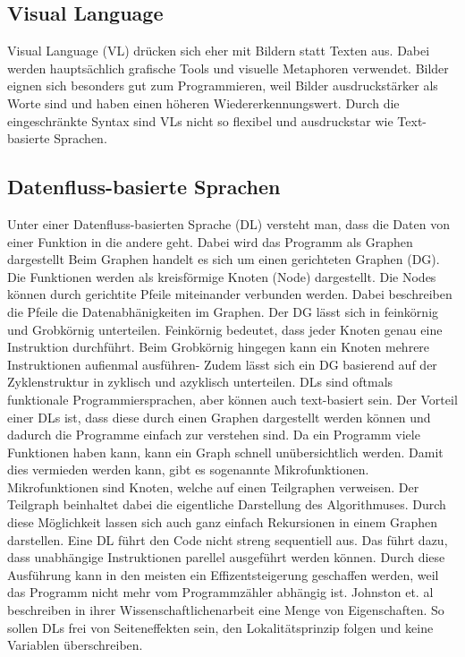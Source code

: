 \documentclass{article}
\begin{document}
    \subsection{Visual Language}
    Visual Language (VL) drücken sich eher mit Bildern statt Texten aus. \cite{5}
    Dabei werden hauptsächlich grafische Tools und visuelle Metaphoren verwendet. Bilder eignen sich besonders gut zum Programmieren, weil Bilder ausdruckstärker als Worte sind und haben einen höheren Wiedererkennungswert. Durch die eingeschränkte Syntax sind VLs nicht so flexibel und ausdruckstar wie Text-basierte Sprachen. \cite{16}
    \subsection{Datenfluss-basierte Sprachen}
    Unter einer Datenfluss-basierten Sprache (DL) versteht man, dass die Daten von einer Funktion in die andere geht. Dabei wird das Programm als Graphen dargestellt\cite{11}
    Beim Graphen handelt es sich um einen gerichteten Graphen (DG). Die Funktionen werden als kreisförmige Knoten (Node) dargestellt. Die Nodes können durch gerichtite Pfeile miteinander verbunden werden. Dabei beschreiben die Pfeile die Datenabhänigkeiten im Graphen.\cite{2}
    Der DG lässt sich in feinkörnig und Grobkörnig unterteilen. Feinkörnig bedeutet, dass jeder Knoten genau eine Instruktion durchführt. Beim Grobkörnig hingegen kann ein Knoten mehrere Instruktionen aufienmal ausführen-\cite{1}
    Zudem lässt sich ein DG basierend auf der Zyklenstruktur in zyklisch und azyklisch unterteilen. \cite{8}
    DLs sind oftmals funktionale Programmiersprachen, aber können auch text-basiert sein. \cite{2}
    Der Vorteil einer DLs ist, dass diese durch einen Graphen dargestellt werden können \cite{11} und dadurch die Programme einfach zur verstehen sind. \cite{6}
    Da ein Programm viele Funktionen haben kann, kann ein Graph schnell unübersichtlich werden. Damit dies vermieden werden kann, gibt es sogenannte Mikrofunktionen. Mikrofunktionen sind Knoten, welche auf einen Teilgraphen verweisen. Der Teilgraph beinhaltet dabei die eigentliche Darstellung des Algorithmuses. Durch diese Möglichkeit lassen sich auch ganz einfach Rekursionen in einem Graphen darstellen.\cite{11}
    Eine DL führt den Code nicht streng sequentiell aus. Das führt dazu, dass unabhängige Instruktionen parellel ausgeführt werden können.\cite{1}
    Durch diese Ausführung kann in den meisten ein Effizentsteigerung geschaffen werden, weil das Programm nicht mehr vom Programmzähler abhängig ist. \cite{2}
    Johnston et. al beschreiben in ihrer Wissenschaftlichenarbeit eine Menge von Eigenschaften. So sollen DLs frei von Seiteneffekten sein, den Lokalitätsprinzip folgen und keine Variablen überschreiben.\cite{2}
\end{document}
